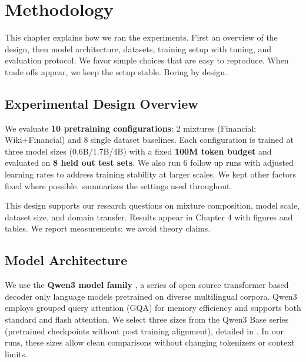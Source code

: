 \chapter{Methodology}

This chapter explains how we ran the experiments. First an overview of the design, then model architecture, datasets, training setup with tuning, and evaluation protocol. We favor simple choices that are easy to reproduce. When trade offs appear, we keep the setup stable. Boring by design.

\section{Experimental Design Overview}

We evaluate \textbf{10 pretraining configurations}: 2 mixtures (Financial; Wiki+Financial) and 8 single dataset baselines. Each configuration is trained at three model sizes (0.6B/1.7B/4B) with a fixed \textbf{100M token budget} and evaluated on \textbf{8 held out test sets}. We also run 6 follow up runs with adjusted learning rates to address training stability at larger scales. We kept other factors fixed where possible.  summarizes the settings used throughout.



This design supports our research questions on mixture composition, model scale, dataset size, and domain transfer. Results appear in Chapter 4 with figures and tables. We report measurements; we avoid theory claims.

\section{Model Architecture}

We use the \textbf{Qwen3 model family} \parencite{yang2024qwen2,qwen3}, a series of open source transformer based decoder only language models pretrained on diverse multilingual corpora. Qwen3 employs grouped query attention (GQA) for memory efficiency and supports both standard and flash attention. We select three sizes from the Qwen3 Base series (pretrained checkpoints without post training alignment), detailed in . In our runs, these sizes allow clean comparisons without changing tokenizers or context limits.

